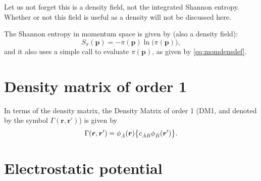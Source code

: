 Let us not forget this is a density field, not the integrated Shannon entropy. Whether or not this field is useful as a density will not be discussed here.

The Shannon entropy in momentum space is given by (also a density field):
%
\begin{equation}
   S_{\pi}(\boldsymbol{p})=-\pi(\boldsymbol{p})\ln\big(\pi(\boldsymbol{p})\big),
\end{equation}
%
and it also uses a simple call to evaluate $\pi(\boldsymbol{p})$, as given by \ref{eq:momdensdef}.


\section{Density matrix of order 1}

In terms of the density matrix, the Density Matrix of order 1 (DM1, and denoted by the symbol $\Gamma(\boldsymbol{r},\boldsymbol{r}')$) is given by
%
\begin{equation}
   \Gamma(\boldsymbol{r},\boldsymbol{r}')=\phi_{\dot{A}}(\boldsymbol{r})\big\{c_{\dot{A}\dot{B}}\phi_{\dot{B}}(\boldsymbol{r}')\big\}.
\end{equation}
%

\section{Electrostatic potential}

